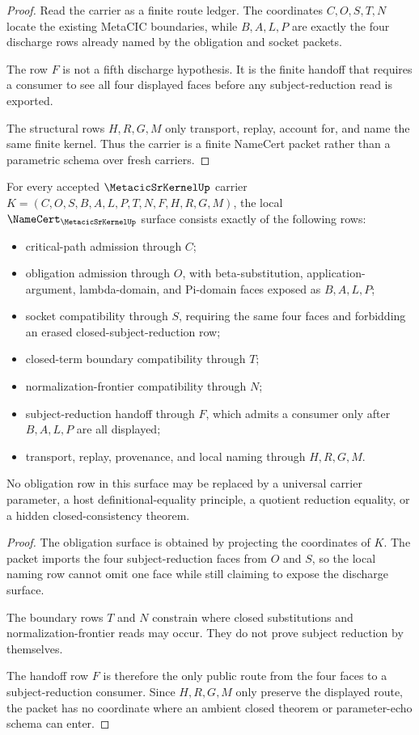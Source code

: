 \begin{proof}
Read the carrier as a finite route ledger. The coordinates $C,O,S,T,N$ locate the existing MetaCIC boundaries, while $B,A,L,P$ are exactly the four discharge rows already named by the obligation and socket packets.

The row $F$ is not a fifth discharge hypothesis. It is the finite handoff that requires a consumer to see all four displayed faces before any subject-reduction read is exported.

The structural rows $H,R,G,M$ only transport, replay, account for, and name the same finite kernel. Thus the carrier is a finite NameCert packet rather than a parametric schema over fresh carriers.
\end{proof}

\begin{theorem}\label{thm:metacic-sr-kernel-namecert-obligations}
For every accepted $\MetacicSrKernelUp$ carrier $K=(C,O,S,B,A,L,P,T,N,F,H,R,G,M)$, the local $\NameCert_{\MetacicSrKernelUp}$ surface consists exactly of the following rows:
\begin{itemize}
\item critical-path admission through $C$;
\item obligation admission through $O$, with beta-substitution, application-argument, lambda-domain, and Pi-domain faces exposed as $B,A,L,P$;
\item socket compatibility through $S$, requiring the same four faces and forbidding an erased closed-subject-reduction row;
\item closed-term boundary compatibility through $T$;
\item normalization-frontier compatibility through $N$;
\item subject-reduction handoff through $F$, which admits a consumer only after $B,A,L,P$ are all displayed;
\item transport, replay, provenance, and local naming through $H,R,G,M$.
\end{itemize}
No obligation row in this surface may be replaced by a universal carrier parameter, a host definitional-equality principle, a quotient reduction equality, or a hidden closed-consistency theorem.
\end{theorem}

\begin{proof}
The obligation surface is obtained by projecting the coordinates of $K$. The packet imports the four subject-reduction faces from $O$ and $S$, so the local naming row cannot omit one face while still claiming to expose the discharge surface.

The boundary rows $T$ and $N$ constrain where closed substitutions and normalization-frontier reads may occur. They do not prove subject reduction by themselves.

The handoff row $F$ is therefore the only public route from the four faces to a subject-reduction consumer. Since $H,R,G,M$ only preserve the displayed route, the packet has no coordinate where an ambient closed theorem or parameter-echo schema can enter.
\end{proof}

